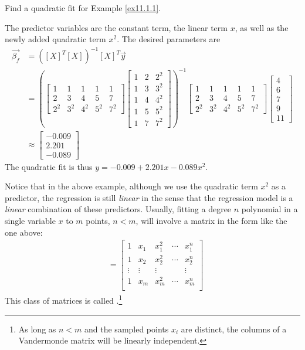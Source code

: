 \begin{exmp}
Find a quadratic fit for Example \ref{ex11.1.1}.
\end{exmp}
\begin{solution}
The predictor variables are the constant term, the linear term $x$, as well as the newly added quadratic term $x^2$. The desired parameters are
\begin{align*}
\vec{\beta_f} &= ([X]^T[X])^{-1}[X]^T \vec{y} \\
&=
\left(
\begin{bmatrix}
1 & 1 & 1 & 1 & 1 \\
2 & 3 & 4 & 5 & 7 \\
2^2 & 3^2 & 4^2 & 5^2 & 7^2
\end{bmatrix}
\begin{bmatrix}
1 & 2 & 2^2 \\
1 & 3 & 3^2 \\
1 & 4 & 4^2 \\
1 & 5 & 5^2 \\
1 & 7 & 7^2 
\end{bmatrix}
\right)^{-1}
\begin{bmatrix}
1 & 1 & 1 & 1 & 1 \\
2 & 3 & 4 & 5 & 7 \\
2^2 & 3^2 & 4^2 & 5^2 & 7^2
\end{bmatrix}
\begin{bmatrix}
4 \\
6 \\
7 \\
9 \\
11
\end{bmatrix} \\
& \approx
\begin{bmatrix}
-0.009 \\
2.201 \\
-0.089 
\end{bmatrix}
\end{align*}
The quadratic fit is thus $y = -0.009 + 2.201x - 0.089x^2$.
\end{solution}
Notice that in the above example, although we use the quadratic term $x^2$ as a predictor, the regression is still \textit{linear} in the sense that the regression model is a \textit{linear} combination of these predictors. Usually, fitting a degree $n$ polynomial in a single variable $x$ to $m$ points, $n < m$, will involve a matrix in the form like the one above:
\begin{align}
[X]
&= 
\begin{bmatrix}
1 & x_1 & x_1^2 & \cdots & x_1^n \\
1 & x_2 & x_2^2 & \cdots & x_2^n \\
\vdots & \vdots & \vdots & & \vdots \\
1 & x_m & x_m^2 & \cdots & x_m^n \\
\end{bmatrix} 
\end{align}
This class of matrices is called .\footnote{As long as $n < m$ and the sampled points $x_i$ are distinct, the columns of a Vandermonde matrix will be linearly independent.}


